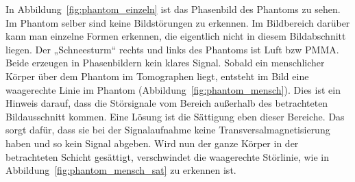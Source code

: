 \documentclass[
    11pt,
    ngerman
]{scrbook}
\begin{document}
In Abbildung~\ref{fig:phantom_einzeln} ist das Phasenbild des Phantoms zu
sehen. Im Phantom selber sind keine Bildstörungen zu erkennen. Im Bildbereich
darüber kann man einzelne Formen erkennen, die eigentlich nicht in diesem
Bildabschnitt liegen. Der „Schneesturm“ rechts und links des Phantoms ist Luft
bzw PMMA. Beide erzeugen in Phasenbildern kein klares Signal. Sobald ein
menschlicher Körper über dem Phantom im Tomographen liegt, entsteht im Bild
eine waagerechte Linie im Phantom (Abbildung~\ref{fig:phantom_mensch}). Dies
ist ein Hinweis darauf, dass die Störsignale vom Bereich außerhalb des
betrachteten Bildausschnitt kommen. Eine Lösung ist die Sättigung eben dieser
Bereiche. Das sorgt dafür, dass sie bei der Signalaufnahme keine
Transversalmagnetisierung haben und so kein Signal abgeben. Wird nun der ganze
Körper in der betrachteten Schicht gesättigt, verschwindet die waagerechte
Störlinie, wie in Abbildung~\ref{fig:phantom_mensch_sat} zu erkennen ist.
\end{document}
